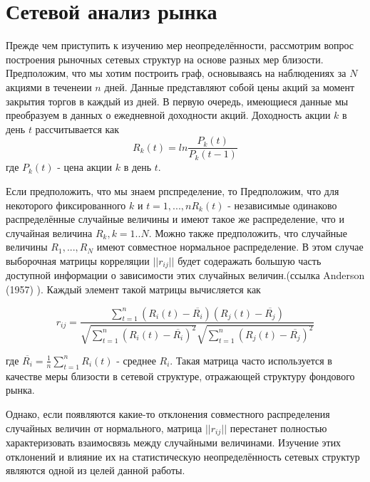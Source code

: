 \section{Сетевой анализ рынка}
Прежде чем приступить к изучению мер неопределённости, рассмотрим вопрос построения рыночных сетевых структур на основе разных мер близости. Предположим, что мы хотим построить граф, основываясь на наблюдениях за $N$ акциями в теченеии $n$ дней. Данные представляют собой цены акций за момент закрытия торгов в каждый из дней. В первую очередь, имеющиеся данные мы преобразуем в данных о ежедневной доходности акций. Доходность акции $k$ в день $t$ рассчитывается как	
\begin{equation}
	R_k(t)=ln\frac{P_k(t)}{P_k(t-1)}
\end{equation}
где $P_k(t)$ -  цена акции $k$ в день $t$. 

Если предположить, что мы знаем рпспределение, то 
Предположим, что для некоторого фиксированного $k$ и $t=1,...,n R_k(t)$ - независимые одинаково распределённые случайные величины и имеют такое же распределение, что и случайная величина $R_k, k=1..N$. Можно также предположить, что случайные величины $R_1, ... ,R_N$ имеют совместное нормальное распределение. В этом случае выборочная матрицы корреляции $||r_{i j}||$ будет содеражать большую часть доступной информации о зависимости этих случайных величин.(ссылка Anderson (1957) ). Каждый элемент такой матрицы вычисляется как 

\begin{equation}
	r_{i j} = \frac{ \sum_{t=1}^{n} (R_i(t) - \overline{R_i})(R_j(t) - \overline{R_j})  }{ \sqrt{ \sum_{t=1}^{n} (R_i(t) - \overline{R_i})^2 }\sqrt{ \sum_{t=1}^{n} (R_j(t) - \overline{R_j})^2 } }
\end{equation}

где $\overline{R_i} =  \frac{1}{n}\sum_{t=1}^{n} R_i(t)$ - среднее $R_i$. Такая матрица часто используется в качестве меры близости в сетевой структуре, отражающей структуру фондового рынка.

Однако, если появляются какие-то отклонения совместного распределения случайных величин от нормального, матрица $||r_{i j}||$ перестанет полностью характеризовать взаимосвязь между случайными величинами. Изучение этих отклонений и влияние их на статистическую неопределённость сетевых структур являются одной из целей данной работы. 

